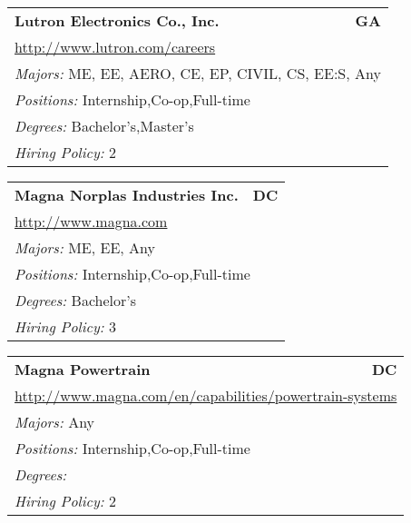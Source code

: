 \documentclass[twoside]{article}
\begin{document}
\begin{center}
\begin{multicols}{3}
\begin{FlushLeft}
\begin{minipage}{\columnwidth}
\end{minipage}
 
\begin{minipage}{\columnwidth}\begin{tabularx}{.95\columnwidth}{Xr}
                 {\Large\bf Lutron Electronics Co., Inc.} & {\Large\bf GA}\\
    \multicolumn{2}{p{.95\columnwidth}}{\url{http://www.lutron.com/careers}}\\
    \multicolumn{2}{p{.95\columnwidth}}{\emph{Majors:} ME, EE, AERO, CE, EP, CIVIL, CS, EE:S, Any}\\
    \multicolumn{2}{p{.95\columnwidth}}{\emph{Positions:} Internship,Co-op,Full-time}\\
    \multicolumn{2}{p{.95\columnwidth}}{\emph{Degrees:} Bachelor's,Master's}\\
    \multicolumn{2}{p{.95\columnwidth}}{\emph{Hiring Policy:} 2}\\
    \end{tabularx}
    
\end{minipage}
 
\begin{minipage}{\columnwidth}\begin{tabularx}{.95\columnwidth}{Xr}
                 {\Large\bf Magna Norplas Industries Inc.} & {\Large\bf DC}\\
    \multicolumn{2}{p{.95\columnwidth}}{\url{http://www.magna.com}}\\
    \multicolumn{2}{p{.95\columnwidth}}{\emph{Majors:} ME, EE, Any}\\
    \multicolumn{2}{p{.95\columnwidth}}{\emph{Positions:} Internship,Co-op,Full-time}\\
    \multicolumn{2}{p{.95\columnwidth}}{\emph{Degrees:} Bachelor's}\\
    \multicolumn{2}{p{.95\columnwidth}}{\emph{Hiring Policy:} 3}\\
    \end{tabularx}
    
\end{minipage}
 
\begin{minipage}{\columnwidth}\begin{tabularx}{.95\columnwidth}{Xr}
                 {\Large\bf Magna Powertrain} & {\Large\bf DC}\\
    \multicolumn{2}{p{.95\columnwidth}}{\url{http://www.magna.com/en/capabilities/powertrain-systems}}\\
    \multicolumn{2}{p{.95\columnwidth}}{\emph{Majors:} Any}\\
    \multicolumn{2}{p{.95\columnwidth}}{\emph{Positions:} Internship,Co-op,Full-time}\\
    \multicolumn{2}{p{.95\columnwidth}}{\emph{Degrees:} }\\
    \multicolumn{2}{p{.95\columnwidth}}{\emph{Hiring Policy:} 2}\\
    \end{tabularx}
    

\end{minipage}
\end{FlushLeft}
\end{multicols}
\end{center}
\end{document}
